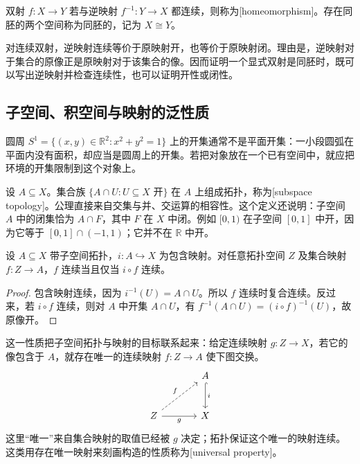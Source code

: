 \begin{definition}\label{g1:def:homeomorphism}
	双射 \(f:X\to Y\) 若与逆映射 \(f^{-1}:Y\to X\) 都连续，则称为[homeomorphism]。存在同胚的两个空间称为同胚的，记为 \(X\cong Y\)。
\end{definition}

对连续双射，逆映射连续等价于原映射开，也等价于原映射闭。理由是，逆映射对于集合的原像正是原映射对于该集合的像。因而证明一个显式双射是同胚时，既可以写出逆映射并检查连续性，也可以证明开性或闭性。

\subsection{子空间、积空间与映射的泛性质}
\label{g1:subsec:0401:02}

圆周 \(S^1=\{(x,y)\in\mathbb R^2:x^2+y^2=1\}\) 上的开集通常不是平面开集：一小段圆弧在平面内没有面积，却应当是圆周上的开集。若把对象放在一个已有空间中，就应把环境的开集限制到这个对象上。

设 \(A\subseteq X\)。集合族 \(\{A\cap U:U\subseteq X\text{ 开}\}\) 在 \(A\) 上组成拓扑，称为[subspace topology]。公理直接来自交集与并、交运算的相容性。这个定义还说明：子空间 \(A\) 中的闭集恰为 \(A\cap F\)，其中 \(F\) 在 \(X\) 中闭。例如 \([0,1)\) 在子空间 \([0,1]\) 中开，因为它等于 \([0,1]\cap(-1,1)\)；它并不在 \(\mathbb R\) 中开。

\begin{proposition}\label{g1:prop:subspace-universal}
	设 \(A\subseteq X\) 带子空间拓扑，\(i:A\hookrightarrow X\) 为包含映射。对任意拓扑空间 \(Z\) 及集合映射 \(f:Z\to A\)，\(f\) 连续当且仅当 \(i\circ f\) 连续。
\end{proposition}
\begin{proof}
	包含映射连续，因为 \(i^{-1}(U)=A\cap U\)。所以 \(f\) 连续时复合连续。反过来，若 \(i\circ f\) 连续，则对 \(A\) 中开集 \(A\cap U\)，有 \(f^{-1}(A\cap U)=(i\circ f)^{-1}(U)\)，故原像开。
\end{proof}

这一性质把子空间拓扑与映射的目标联系起来：给定连续映射 \(g:Z\to X\)，若它的像包含于 \(A\)，就存在唯一的连续映射 \(f:Z\to A\) 使下图交换。
\[
	\begin{tikzcd}[column sep=large,row sep=large]
		& A \arrow[d,hook,"i"] \\
		Z \arrow[ur,dashed,"f"] \arrow[r,"g"'] & X
	\end{tikzcd}
\]
这里“唯一”来自集合映射的取值已经被 \(g\) 决定；拓扑保证这个唯一的映射连续。这类用存在唯一映射来刻画构造的性质称为[universal property]。

